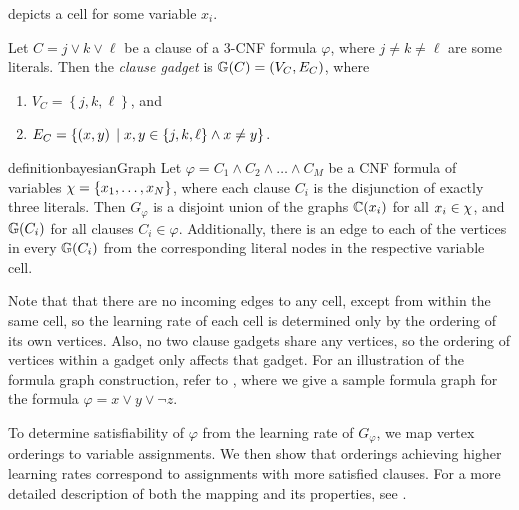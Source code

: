  depicts a cell for some variable $x_i$.

\begin{definition}
    Let $ C = j \lor k \lor \ell $ be a clause of a 3-CNF formula $ \varphi $, where $ j \neq k \neq \ell $ are some literals.
    Then the \emph{clause gadget} is $ \mathbb{G}\!\left(C\right) = \left( V_C, E_C \right) $, where \begin{enumerate}[ ]
    	\item $ V_C = \left\{ j,k,\ell \right\} $, and
    	\item $ E_C = \left\{ \left( x,y \right) \;\vert\; x,y \in \left\{ j,k,\ell \right\} \land x \neq y \right\} $.
    \end{enumerate}
\end{definition}

\begin{restatable}{definition}{bayesianGraph}\label{def:bayesian_graph}
	Let $ \varphi = C_1 \land C_2 \land \dots \land C_M $ be a CNF formula of variables $ \chi = \left\{ x_1, \ldots, x_N \right\} $, where each clause $ C_i $ is the disjunction of exactly three literals.
	Then $ G_\varphi $ is a disjoint union of the graphs $ \mathbb{C}\!\left(x_i\right) $ for all $ {x_i} \in \chi $, and $ \mathbb{G}\!\left(C_i\right) $ for all clauses $ C_i \in \varphi $.
        Additionally, there is an edge to each of the vertices in every $ \mathbb{G}\!\left(C_i\right) $ from the corresponding literal nodes in the respective variable cell.
\end{restatable}

Note that that there are no incoming edges to any cell, except from within the same cell, so the learning rate of each cell is determined only by the ordering of its own vertices. Also, no two clause gadgets share any vertices, so the ordering of vertices within a gadget only affects that gadget.
For an illustration of the formula graph construction, refer to , where we give a sample formula graph for the formula $ \varphi = x \lor y \lor \lnot z $.




\label{par:ordering_literals}
To determine satisfiability of $\varphi$ from the learning rate of $ G_\varphi $, we map vertex orderings to variable assignments.
We then show that orderings achieving higher learning rates correspond to assignments with more satisfied clauses.
For a more detailed description of both the mapping and its properties, see .

